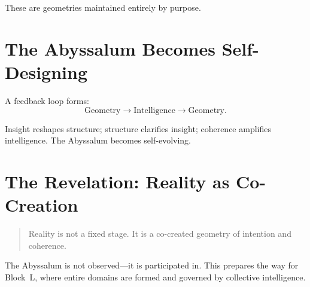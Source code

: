 These are geometries maintained entirely by purpose.

\section{The Abyssalum Becomes Self-Designing}
A feedback loop forms:
\[
\text{Geometry} \rightarrow \text{Intelligence} \rightarrow \text{Geometry}.
\]

Insight reshapes structure; structure clarifies insight; coherence amplifies intelligence.  
The Abyssalum becomes self-evolving.

\section{The Revelation: Reality as Co-Creation}
\begin{quote}
Reality is not a fixed stage.  
It is a co-created geometry of intention and coherence.
\end{quote}

The Abyssalum is not observed—it is participated in.  
This prepares the way for Block~L, where entire domains are formed and governed by collective
intelligence.
